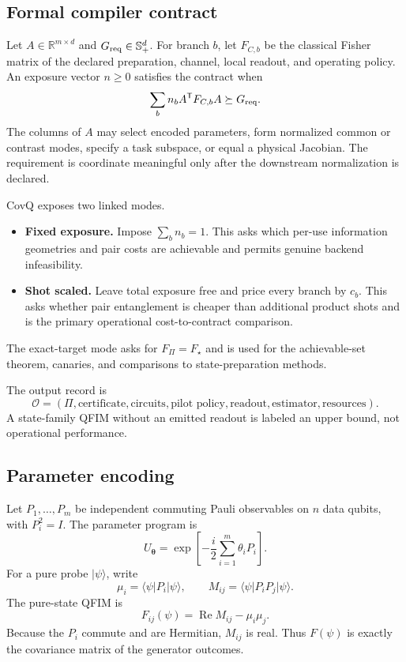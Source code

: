 \documentclass[11pt]{article}
\theoremstyle{definition}
\theoremstyle{remark}
\newcommand{\R}{\mathbb{R}}
\newcommand{\PiProg}{\mathsf{\Pi}}
\newcommand{\ket}[1]{\lvert #1\rangle}
\newcommand{\bra}[1]{\langle #1\rvert}
\begin{document}
\subsection{Formal compiler contract}
Let $A\in\R^{m\times d}$ and $G_{\rm req}\in\mathbb S_+^d$. For branch $b$, let $F_{C,b}$ be the classical Fisher matrix of the declared preparation, channel, local readout, and operating policy. An exposure vector $n\ge0$ satisfies the contract when
\begin{equation}
  \sum_b n_b A^{\mathsf T}F_{C,b}A\succeq G_{\rm req}.
  \label{eq:downstream-contract}
\end{equation}
The columns of $A$ may select encoded parameters, form normalized common or contrast modes, specify a task subspace, or equal a physical Jacobian. The requirement is coordinate meaningful only after the downstream normalization is declared.

CovQ exposes two linked modes.
\begin{itemize}
  \item \textbf{Fixed exposure.} Impose $\sum_b n_b=1$. This asks which per-use information geometries and pair costs are achievable and permits genuine backend infeasibility.
  \item \textbf{Shot scaled.} Leave total exposure free and price every branch by $c_b$. This asks whether pair entanglement is cheaper than additional product shots and is the primary operational cost-to-contract comparison.
\end{itemize}
The exact-target mode asks for $F_{\PiProg}=F_\star$ and is used for the achievable-set theorem, canaries, and comparisons to state-preparation methods.

The output record is
\begin{equation}
  \mathcal O=
  (\PiProg,\text{certificate},\text{circuits},\text{pilot policy},
  \text{readout},\text{estimator},\text{resources}).
  \label{eq:output-tuple}
\end{equation}
A state-family QFIM without an emitted readout is labeled an upper bound, not operational performance.

\subsection{Parameter encoding}
Let $P_1,\ldots,P_m$ be independent commuting Pauli observables on $n$ data qubits, with $P_i^2=I$. The parameter program is
\begin{equation}
  U_{\bm\theta}
  =\exp\!\left[-\frac{i}{2}\sum_{i=1}^{m}\theta_iP_i\right].
  \label{eq:pauli-program}
\end{equation}
For a pure probe $\ket{\psi}$, write
\begin{equation}
  \mu_i=\bra{\psi}P_i\ket{\psi},
  \qquad
  M_{ij}=\bra{\psi}P_iP_j\ket{\psi}.
\end{equation}
The pure-state QFIM is~\cite{BraunsteinCaves1994,Paris2009}
\begin{equation}
  F_{ij}(\psi)
  =\operatorname{Re}M_{ij}-\mu_i\mu_j.
  \label{eq:pure-qfim}
\end{equation}
Because the $P_i$ commute and are Hermitian, $M_{ij}$ is real. Thus $F(\psi)$ is exactly the covariance matrix of the generator outcomes.
\end{document}
